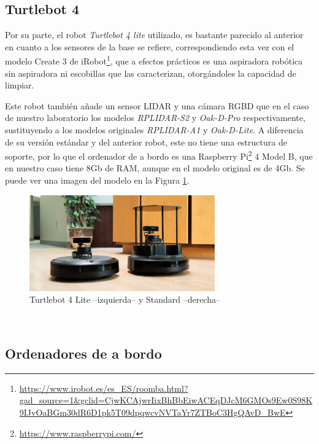 
\subsection{Turtlebot 4}
\label{sec:turtlebot4}

Por su parte, el robot \textit{Turtlebot 4 lite} utilizado, es bastante parecido
al anterior en cuanto a los sensores de la base se refiere, correspondiendo esta
vez con el modelo Create 3 de
iRobot\footnote{\url{https://www.irobot.es/es_ES/roomba.html?gad_source=1&gclid=CjwKCAjwrIixBhBbEiwACEqDJcM6GMOs9Ew0S98K9IJvOaBGm30dR6D1pk5T09dpqwcvNVTaYr7ZTBoC3HgQAvD_BwE}},
que a efectos prácticos es una aspiradora robótica sin aspiradora ni escobillas
que las caracterizan, otorgándoles la capacidad de limpiar.

Este robot también añade un sensor LIDAR y una cámara RGBD que en el caso de
nuestro laboratorio los modelos \textit{RPLIDAR-S2} y \textit{Oak-D-Pro}
respectivamente, sustituyendo a los modelos originales \textit{RPLIDAR-A1} y
\textit{Oak-D-Lite}.
A diferencia de su versión estándar y del anterior robot, este no tiene una
estructura de soporte, por lo que el ordenador de a bordo es una Raspberry
Pi\footnote{\url{https://www.raspberrypi.com/}} 4 Model B, que en nuestro caso
tiene 8Gb de RAM, aunque en el modelo original es de 4Gb.
Se puede ver una imagen del modelo en la Figura \ref{fig:turtlebot4}.

\begin{figure} [h!]
  \begin{center}
    \includegraphics[width=8cm]{figs/turtlebot4}
  \end{center}
  \caption{Turtlebot 4 Lite --izquierda-- y Standard --derecha-- \cite{turtlebot4}}
  \label{fig:turtlebot4}
\end{figure}\


\subsection{Ordenadores de a bordo}
\label{sec:a_bordo}

